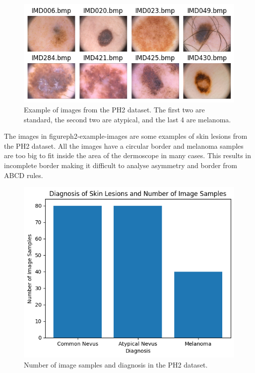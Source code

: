 \begin{figure}
    \centering
    \includegraphics[scale=0.75]{images/ph2/ph2-example-images.png}
    \caption{Example of images from the PH2 dataset. The first two are standard, the second two are atypical, and the last 4 are melanoma.} 
\end{figure}\label{ph2-example-images}

The images in figure{ph2-example-images} are some examples of skin lesions from the PH2 dataset. All the images have a circular border and melanoma samples are too big to fit inside the area of the dermoscope in many cases. This results in incomplete border making it difficult to analyse asymmetry and border from ABCD rules.

\begin{figure}
    \centering
    \includegraphics[scale=0.75]{images/ph2/ph2-diagnosis-number.png}
    \caption{Number of image samples and diagnosis in the PH2 dataset.} 
\end{figure}\label{ph2-diagnosis-number}

